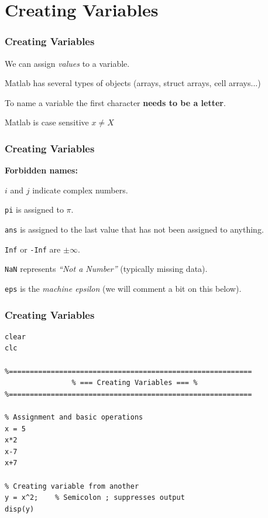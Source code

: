 \documentclass[11pt,xcolor={svgnames},aspectratio=169,usepdftitle=false]{beamer}
\let\toneitemize\itemize
\let\ttwoitemize\enditemize
\renewenvironment{itemize}{\toneitemize\addtolength{\itemsep}{1.35\baselineskip}}{\ttwoitemize}
\begin{document}
\section{Creating Variables}

\begin{frame}
    \frametitle{Creating Variables}
    \begin{itemize}
        \item We can assign \textit{values} to a variable.
        \item Matlab has several types of objects (arrays, struct arrays, cell arrays...)
        \item To name a variable the first character \alert{\textbf{needs to be a letter}}.
        \item Matlab is case sensitive $x \neq X$
    \end{itemize}
\end{frame}

\begin{frame}[fragile]
    \frametitle{Creating Variables}
\alert{\textbf{Forbidden names:}}
\begin{itemize}
	\item $i$ and $j$ indicate complex numbers.
	\item \verb;pi; is assigned to $\pi$.
	\item \verb;ans; is assigned to the last value that has not been assigned to anything.
	\item \verb;Inf; or \verb;-Inf; are $\pm\infty$.
	\item \verb;NaN; represents \textit{``Not a Number''} (typically missing data).
	\item \verb;eps; is the \textit{machine epsilon} (we will comment a bit on this below).
\end{itemize}
\end{frame}

\begin{frame}[fragile]
    \frametitle{Creating Variables}
\begin{lstlisting}
clear
clc

%==========================================================
                % === Creating Variables === %
%==========================================================

% Assignment and basic operations
x = 5
x*2
x-7
x+7

% Creating variable from another
y = x^2;    % Semicolon ; suppresses output
disp(y)
\end{lstlisting}
\end{frame}
\end{document}
